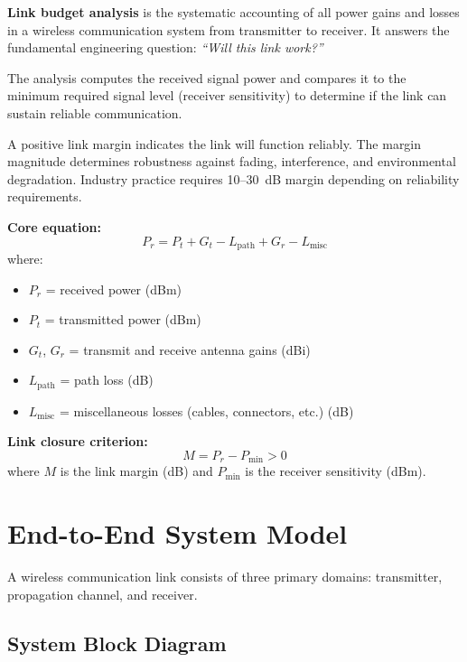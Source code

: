 \textbf{Link budget analysis} is the systematic accounting of all power gains and losses in a wireless communication system from transmitter to receiver. It answers the fundamental engineering question: \emph{``Will this link work?''}

The analysis computes the received signal power and compares it to the minimum required signal level (receiver sensitivity) to determine if the link can sustain reliable communication.

\begin{keyconcept}
A positive link margin indicates the link will function reliably. The margin magnitude determines robustness against fading, interference, and environmental degradation. Industry practice requires 10--30~dB margin depending on reliability requirements.
\end{keyconcept}

\textbf{Core equation:}
\begin{equation}
\label{eq:link_budget_basic}
P_r = P_t + G_t - L_{\text{path}} + G_r - L_{\text{misc}}
\end{equation}
where:
\begin{itemize}
\item $P_r$ = received power (dBm)
\item $P_t$ = transmitted power (dBm)
\item $G_t$, $G_r$ = transmit and receive antenna gains (dBi)
\item $L_{\text{path}}$ = path loss (dB)
\item $L_{\text{misc}}$ = miscellaneous losses (cables, connectors, etc.) (dB)
\end{itemize}

\textbf{Link closure criterion:}
\begin{equation}
\label{eq:link_margin}
M = P_r - P_{\text{min}} > 0
\end{equation}
where $M$ is the link margin (dB) and $P_{\text{min}}$ is the receiver sensitivity (dBm).

\section{End-to-End System Model}

A wireless communication link consists of three primary domains: transmitter, propagation channel, and receiver.

\subsection{System Block Diagram}

